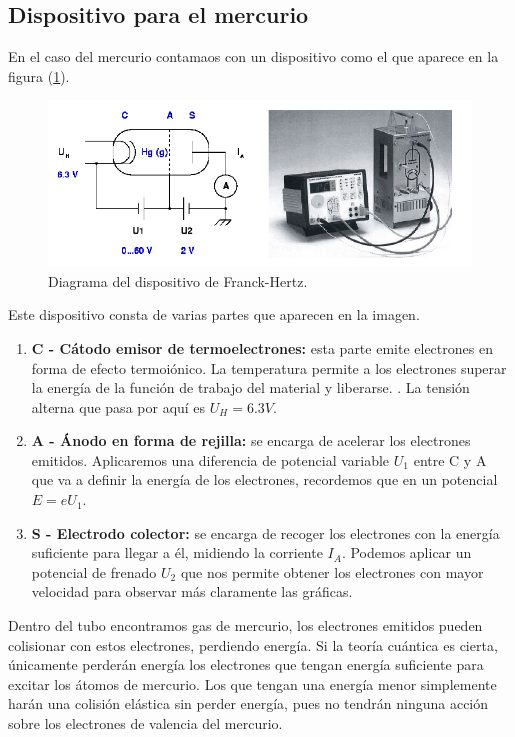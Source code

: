 \documentclass{article}
\begin{document}
\subsection{Dispositivo para el mercurio}

En el caso del mercurio contamaos con un dispositivo como el que aparece en la figura (\ref{fig:FHHg}).

\begin{figure}[h!]
\begin{center}
\includegraphics[max width=\linewidth]{FHHg.png}
\caption{Diagrama del dispositivo de Franck-Hertz.}
\label{fig:FHHg}
\end{center}
\end{figure}

Este dispositivo consta de varias partes que aparecen en la imagen.

\begin{enumerate}
\item \textbf{C - Cátodo emisor de termoelectrones:} esta parte emite electrones en forma de efecto termoiónico. La temperatura permite a los electrones superar la energía de la función de trabajo del material y liberarse. \cite{thermoIonic}. La tensión alterna que pasa por aquí es $U_H = 6.3 V$.
\item \textbf{A - Ánodo en forma de rejilla:} se encarga de acelerar los electrones emitidos. Aplicaremos una diferencia de potencial variable $U_1$ entre C y A que va a definir la energía de los electrones, recordemos que en un potencial $E = eU_1$.
\item \textbf{S - Electrodo colector:} se encarga de recoger los electrones con la energía suficiente para llegar a él, midiendo la corriente $I_A$. Podemos aplicar un potencial de frenado $U_2$ que nos permite obtener los electrones con mayor velocidad para observar más claramente las gráficas.
\end{enumerate}

Dentro del tubo encontramos gas de mercurio, los electrones emitidos pueden colisionar con estos electrones, perdiendo energía. Si la teoría cuántica es cierta, únicamente perderán energía los electrones que tengan energía suficiente para excitar los átomos de mercurio. Los que tengan una energía menor simplemente harán una colisión elástica sin perder energía, pues no tendrán ninguna acción sobre los electrones de valencia del mercurio.
\end{document}
